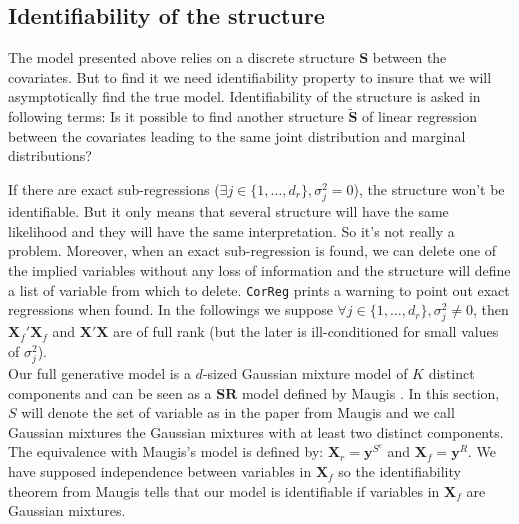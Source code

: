 \documentclass[12pt,a4paper]{report}
\begin{document}
	
\subsection{Identifiability of the structure} \label{preuveident}
	The model presented above relies on a discrete structure $\boldsymbol{S}$ between the covariates. But to find it we need identifiability property to insure that we will asymptotically find the true model. Identifiability of the structure is asked in following terms: Is it possible to find another structure $\tilde{\boldsymbol{S}}$ of linear regression between the covariates leading to the same joint distribution and marginal distributions? 
	
		If there are exact sub-regressions ($\exists j\in \{1,\dots,d_r\}, \sigma^2_j=0$), the structure won't be identifiable. But it only means that several structure will have the same likelihood and they will have the same interpretation. So it's not really a problem. Moreover, when an exact sub-regression is found, we can delete one of the implied variables without any loss of information and the structure will define a list of variable from which to delete. {\tt CorReg} prints a warning to point out exact regressions when found.
	In the followings we suppose $\forall j\in \{1,\dots,d_r\}, \sigma^2_j\neq 0$, then $\boldsymbol{X}_f'\boldsymbol{X}_f$ and $\boldsymbol{X}'\boldsymbol{X}$ are of full rank (but the later is ill-conditioned for small values of $\sigma^2_j$).
	\\
	
Our full generative model is a $d$-sized Gaussian mixture model of $K$ distinct components and 
%	
	can be seen as a $\mathbf{SR}$ model defined by Maugis \cite{maugis2009variable}. In this section, $S$ will denote the set of variable as in the paper from Maugis and we call Gaussian mixtures the Gaussian mixtures with at least two distinct components. The equivalence with Maugis's model is defined by:
	$\boldsymbol{X}_r=\boldsymbol{y}^{S^c}$ and $\boldsymbol{X}_f=\boldsymbol{y}^R$. We have supposed independence between variables in $\boldsymbol{X}_f$ so the identifiability theorem from Maugis tells that our model is identifiable if variables in $\boldsymbol{X}_f$ are Gaussian mixtures.%
	\\
	
\end{document}
